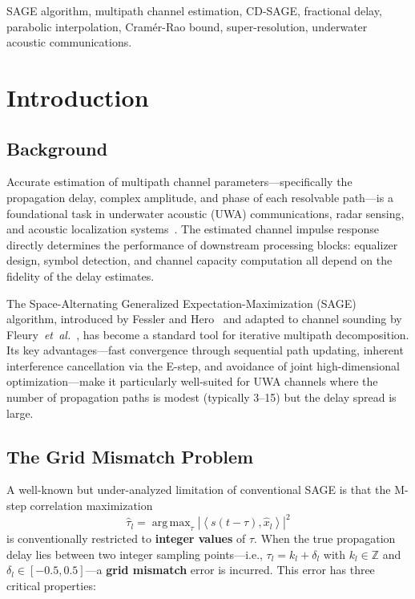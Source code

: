 \documentclass[journal]{IEEEtran}
\DeclareMathOperator*{\argmax}{arg\,max}
\newcommand{\Zz}{\mathbb{Z}}
\newcommand{\abs}[1]{\left| #1 \right|}
\newcommand{\inner}[2]{\left\langle #1, #2 \right\rangle}
\newcommand{\hb}[1]{\hat{#1}}
\begin{document}
\begin{IEEEkeywords}
SAGE algorithm, multipath channel estimation, CD-SAGE, fractional delay, parabolic interpolation, Cram\'{e}r-Rao bound, super-resolution, underwater acoustic communications.
\end{IEEEkeywords}

\section{Introduction}
\label{sec:intro}

\subsection{Background}

Accurate estimation of multipath channel parameters---specifically the propagation delay, complex amplitude, and phase of each resolvable path---is a foundational task in underwater acoustic (UWA) communications, radar sensing, and acoustic localization systems~\cite{stojanovic2009,eggen2001}. The estimated channel impulse response directly determines the performance of downstream processing blocks: equalizer design, symbol detection, and channel capacity computation all depend on the fidelity of the delay estimates.

The Space-Alternating Generalized Expectation-Maximization (SAGE) algorithm, introduced by Fessler and Hero~\cite{fessler1994} and adapted to channel sounding by Fleury~\textit{et~al.}~\cite{fleury1999}, has become a standard tool for iterative multipath decomposition. Its key advantages---fast convergence through sequential path updating, inherent interference cancellation via the E-step, and avoidance of joint high-dimensional optimization---make it particularly well-suited for UWA channels where the number of propagation paths is modest (typically 3--15) but the delay spread is large.

\subsection{The Grid Mismatch Problem}

A well-known but under-analyzed limitation of conventional SAGE is that the M-step correlation maximization
\begin{equation}
\hb{\tau}_l = \argmax_{\tau} \abs{\inner{s(t-\tau)}{\hb{x}_l}}^2
\label{eq:mstep}
\end{equation}
is conventionally restricted to \textbf{integer values} of $\tau$. When the true propagation delay lies between two integer sampling points---i.e., $\tau_l = k_l + \delta_l$ with $k_l \in \Zz$ and $\delta_l \in [-0.5, 0.5]$---a \textbf{grid mismatch} error is incurred. This error has three critical properties:
\end{document}
